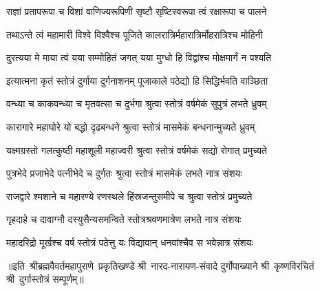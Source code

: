 \twolineshloka
{राज्ञां प्रतापरूपा च विशां वाणिज्यरूपिणी}
{सृष्टौ सृष्टिस्वरूपा त्वं रक्षारूपा च पालने}

\twolineshloka
{तथाऽन्ते त्वं महामारी विश्वे विश्वैश्च पूजिते}
{कालरात्रिर्महारात्रिर्मोहरात्रिश्च मोहिनी}

\twolineshloka
{दुरत्यया मे माया त्वं यया सम्मोहितं जगत्}
{यया मुग्धो हि विद्वांश्च मोक्षमार्गं न पश्यति}


\twolineshloka
{इत्यात्मना कृतं स्तोत्रं दुर्गाया दुर्गनाशनम्}
{पूजाकाले पठेद्यो हि सिद्धिर्भवति वाञ्छिता}

\twolineshloka
{वन्ध्या च काकवन्ध्या च मृतवत्सा च दुर्भगा}
{श्रुत्वा स्तोत्रं वर्षमेकं सुपुत्रं लभते ध्रुवम्}

\twolineshloka
{कारागारे महाघोरे यो बद्धो दृढबन्धने}
{श्रुत्वा स्तोत्रं मासमेकं बन्धनान्मुच्यते ध्रुवम्}

\twolineshloka
{यक्ष्मग्रस्तो गलत्कुष्ठी महाशूली महाज्वरी}
{श्रुत्वा स्तोत्रं वर्षमेकं सद्यो रोगात् प्रमुच्यते}

\twolineshloka
{पुत्रभेदे प्रजाभेदे पत्‍‌नीभेदे च दुर्गतः}
{श्रुत्वा स्तोत्रं मासमेकं लभते नात्र संशयः}

\twolineshloka
{राजद्वारे श्मशाने च महारण्ये रणस्थले}
{हिंस्रजन्तुसमीपे च श्रुत्वा स्तोत्रं प्रमुच्यते}

\twolineshloka
{गृहदाहे च दावाग्नौ दस्युसैन्यसमन्विते}
{स्तोत्रश्रवणमात्रेण लभते नात्र संशयः}

\twolineshloka
{महादरिद्रो मूर्खश्च वर्ष स्तोत्रं पठेत्तु यः}
{विद्यावान् धनवांश्चैव स भवेन्नात्र संशयः}

{॥इति~श्रीब्रह्मवैवर्तमहापुराणे~प्रकृतिखण्डे श्री~नारद-नारायण-संवादे दुर्गोपाख्याने श्री~कृष्णविरचितं श्री~दुर्गास्तोत्रं सम्पूर्णम्॥}
